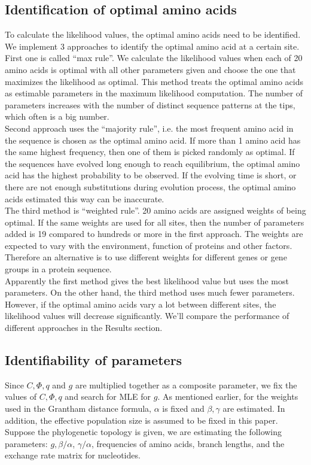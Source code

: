 \documentclass[13pt]{article}
\begin{document}
\subsection{Identification of optimal amino acids}
To calculate the likelihood values, the optimal amino acids need to be identified.
We implement 3 approaches to identify the optimal amino acid at a certain site.
First one is called ``max rule''.
We calculate the likelihood values when each of 20 amino acids is optimal with all other parameters given and choose the one that maximizes the likelihood as optimal.
This method treats the optimal amino acids as estimable parameters in the maximum likelihood computation.
The number of parameters increases with the number of distinct sequence patterns at the tips, which often is a big number. \\
Second approach uses the ``majority rule'', i.e. the most frequent amino acid in the sequence is chosen as the optimal amino acid.
If more than 1 amino acid has the same highest frequency, then one of them is picked randomly as optimal.
If the sequences have evolved long enough to reach equilibrium, the optimal amino acid has the highest probability to be observed.
If the evolving time is short, or there are not enough substitutions during evolution process, the optimal amino acids estimated this way can be inaccurate. \\
The third method is ``weighted rule''. 20 amino acids are assigned weights of being optimal.
If the same weights are used for all sites, then the number of parameters added is 19 compared to hundreds or more in the first approach.
The weights are expected to vary with the environment, function of proteins and other factors.
Therefore an alternative is to use different weights for different genes or gene groups in a protein sequence. \\
Apparently the first method gives the best likelihood value but uses the most parameters.
On the other hand, the third method uses much fewer parameters.
However, if the optimal amino acids vary a lot between different sites, the likelihood values will decrease significantly.
We'll compare the performance of different approaches in the Results section.\\

\subsection{Identifiability of parameters}
Since $C, \Phi, q$ and $g$ are multiplied together as a composite parameter, we fix the values of $C, \Phi, q$ and search for MLE for $g$.
As mentioned earlier, for the weights used in the Grantham distance formula, $\alpha$ is fixed and $\beta, \gamma$ are estimated.
In addition, the effective population size is assumed to be fixed in this paper.
Suppose the phylogenetic topology is given, we are estimating the following parameters: $g, \beta/\alpha$, $\gamma/\alpha$, frequencies of amino acids, branch lengths, and the exchange rate matrix for nucleotides. 
\end{document}
